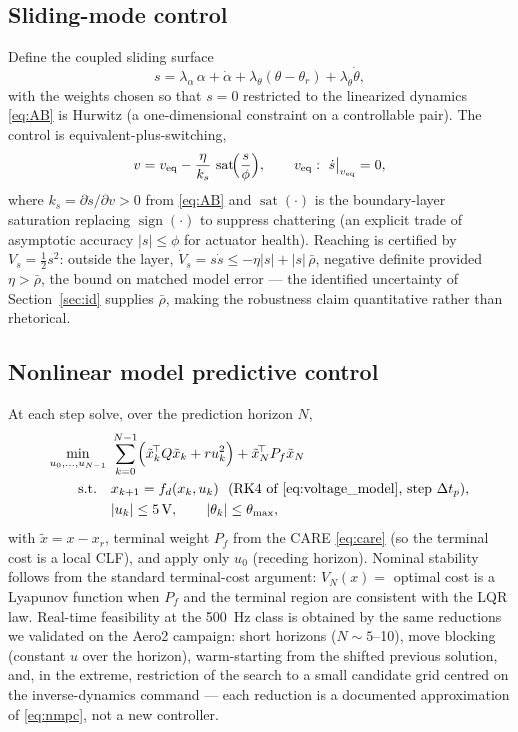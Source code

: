\documentclass[conference]{IEEEtran}
\newcommand{\sat}{\operatorname{sat}}
\newcommand{\sign}{\operatorname{sign}}
\begin{document}
\subsection{Sliding-mode control}
Define the coupled sliding surface
\begin{equation}
s = \lambda_\alpha\,\alpha + \dot\alpha + \lambda_\theta(\theta-\theta_r) + \lambda_{\dot\theta}\dot\theta ,
\end{equation}
with the weights chosen so that $s=0$ restricted to the linearized dynamics \eqref{eq:AB} is Hurwitz (a one-dimensional constraint on a controllable pair). The control is equivalent-plus-switching,
\begin{equation}
v = v_{\mathrm{eq}} - \frac{\eta}{k_s}\,\sat\!\Bigl(\frac{s}{\phi}\Bigr),\qquad
v_{\mathrm{eq}}:\ \dot s\big|_{v_{\mathrm{eq}}} = 0,
\end{equation}
where $k_s = \partial \dot s/\partial v > 0$ from \eqref{eq:AB} and $\sat(\cdot)$ is the boundary-layer saturation replacing $\sign(\cdot)$ to suppress chattering (an explicit trade of asymptotic accuracy $|s|\le\phi$ for actuator health). Reaching is certified by $V_s = \tfrac12 s^2$: outside the layer, $\dot V_s = s\dot s \le -\eta|s| + |s|\,\bar\rho$, negative definite provided $\eta > \bar\rho$, the bound on matched model error --- the identified uncertainty of Section~\ref{sec:id} supplies $\bar\rho$, making the robustness claim quantitative rather than rhetorical.

\subsection{Nonlinear model predictive control}
At each step solve, over the prediction horizon $N$,
\begin{align}
\min_{u_0,\dots,u_{N-1}}\ &\sum_{k=0}^{N-1}\Bigl(\tilde x_k^{\!\top}Q\tilde x_k + r u_k^2\Bigr) + \tilde x_N^{\!\top}P_f\tilde x_N \nonumber\\
\text{s.t.}\quad & x_{k+1} = f_d(x_k, u_k) \ \ \text{(RK4 of \eqref{eq:voltage_model}, step } \Delta t_p),\nonumber\\
& |u_k| \le 5\,\mathrm{V},\qquad |\theta_k|\le\theta_{\max},
\label{eq:nmpc}
\end{align}
with $\tilde x = x - x_r$, terminal weight $P_f$ from the CARE \eqref{eq:care} (so the terminal cost is a local CLF), and apply only $u_0$ (receding horizon). Nominal stability follows from the standard terminal-cost argument: $V_N(x) = $ optimal cost is a Lyapunov function when $P_f$ and the terminal region are consistent with the LQR law. Real-time feasibility at the 500~Hz class is obtained by the same reductions we validated on the Aero2 campaign: short horizons ($N\!\sim\!5$--10), move blocking (constant $u$ over the horizon), warm-starting from the shifted previous solution, and, in the extreme, restriction of the search to a small candidate grid centred on the inverse-dynamics command --- each reduction is a documented approximation of \eqref{eq:nmpc}, not a new controller.
\end{document}
